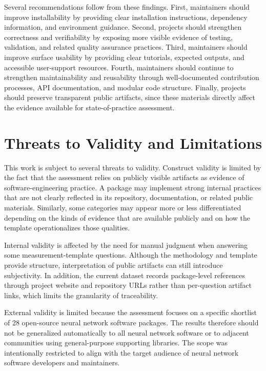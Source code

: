 \documentclass[final,1p,times,authoryear,12pt]{elsarticle}
\providecommand{\wss}[1]{\textcolor{blue}{\textit{#1}}}
\begin{document}
Several recommendations follow from these findings. First,
maintainers should improve installability by providing clear
installation instructions, dependency information, and
environment guidance. Second, projects should strengthen
correctness and verifiability by exposing more visible
evidence of testing, validation, and related quality
assurance practices. Third, maintainers should improve
surface usability by providing clear tutorials, expected
outputs, and accessible user-support resources. Fourth,
maintainers should continue to strengthen maintainability
and reusability through well-documented contribution
processes, API documentation, and modular code structure.
Finally, projects should preserve transparent public
artifacts, since these materials directly affect the
evidence available for state-of-practice assessment.

\section{Threats to Validity and Limitations}\label{validity}
This work is subject to several threats to validity.
Construct validity is limited by the fact that the
assessment relies on publicly visible artifacts as evidence
of software-engineering practice. A package may implement
strong internal practices that are not clearly reflected in
its repository, documentation, or related public materials.
Similarly, some categories may appear more or less
differentiated depending on the kinds of evidence that are
available publicly and on how the template operationalizes
those qualities.

Internal validity is affected by the need for manual
judgment when answering some measurement-template questions.
Although the methodology and template provide structure,
interpretation of public artifacts can still introduce
subjectivity. In addition, the current dataset records
package-level references through project website and
repository URLs rather than per-question artifact links,
which limits the granularity of traceability.

External validity is limited because the assessment focuses
on a specific shortlist of 28 open-source neural network
software packages. The results therefore should not be
generalized automatically to all neural network software or
to adjacent communities using general-purpose supporting
libraries. The scope was intentionally restricted to align
with the target audience of neural network software
developers and maintainers.
\end{document}
